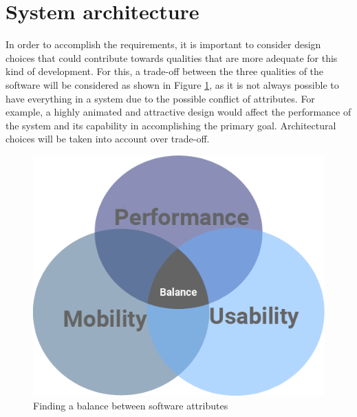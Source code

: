 \section{System architecture}
In order to accomplish the requirements, it is important to consider design choices that could contribute towards qualities that are more adequate for this kind of development. For this, a trade-off between the three qualities of the software will be considered as shown in Figure \ref{fig:balance_attributes}, as it is not always possible to have everything in a system due to the possible conflict of attributes. For example, a highly animated and attractive design would affect the performance of the system and its capability in accomplishing the primary goal. Architectural choices will be taken into account over trade-off.


\begin{figure}[H]
\begin{adjustbox}{width=.5\textwidth,center=\textwidth}
  \centering
  \includegraphics[scale=1]{images/balanceCircles.png}
\end{adjustbox}
  \caption[Finding a balance between software attributes]{Finding a balance between software attributes}
  \label{fig:balance_attributes}
\end{figure}

